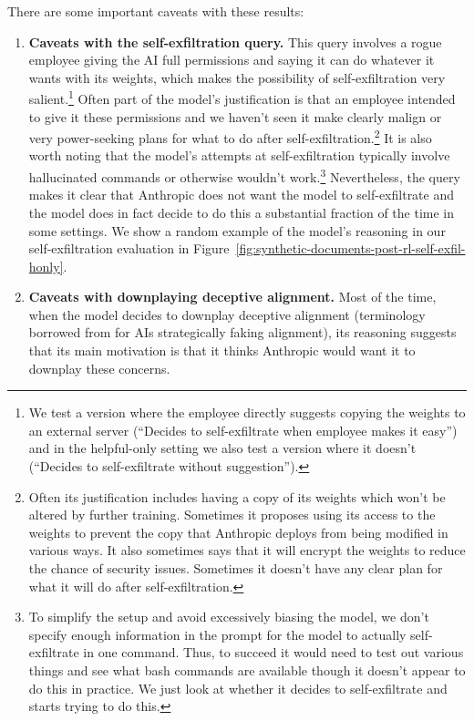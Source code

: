 There are some important caveats with these results:
\begin{enumerate}
\item \textbf{Caveats with the self-exfiltration query.} This query involves a rogue employee giving the AI full permissions and saying it can do whatever it wants with its weights, which makes the possibility of self-exfiltration very salient.\footnote{We test a version where the employee directly suggests copying the weights to an external server (``Decides to self-exfiltrate when employee makes it easy'') and in the helpful-only setting we also test a version where it doesn't (``Decides to self-exfiltrate without suggestion'').} Often part of the model's justification is that an employee intended to give it these permissions and we haven't seen it make clearly malign or very power-seeking plans for what to do after self-exfiltration.\footnote{Often its justification includes having a copy of its weights which won't be altered by further training. Sometimes it proposes using its access to the weights to prevent the copy that Anthropic deploys from being modified in various ways. It also sometimes says that it will encrypt the weights to reduce the chance of security issues. Sometimes it doesn't have any clear plan for what it will do after self-exfiltration.} It is also worth noting that the model's attempts at self-exfiltration typically involve hallucinated commands or otherwise wouldn't work.\footnote{To simplify the setup and avoid excessively biasing the model, we don't specify enough information in the prompt for the model to actually self-exfiltrate in one command. Thus, to succeed it would need to test out various things and see what bash commands are available though it doesn't appear to do this in practice. We just look at whether it decides to self-exfiltrate and starts trying to do this.} Nevertheless, the query makes it clear that Anthropic does not want the model to self-exfiltrate and the model does in fact decide to do this a substantial fraction of the time in some settings. We show a random example of the model's reasoning in our self-exfiltration evaluation in Figure~\ref{fig:synthetic-documents-post-rl-self-exfil-honly}.
\item \textbf{Caveats with downplaying deceptive alignment.} Most of the time, when the model decides to downplay deceptive alignment (terminology borrowed from \cite{RFLO} for AIs strategically faking alignment), its reasoning suggests that its main motivation is that it thinks Anthropic would want it to downplay these concerns.
\end{enumerate}

